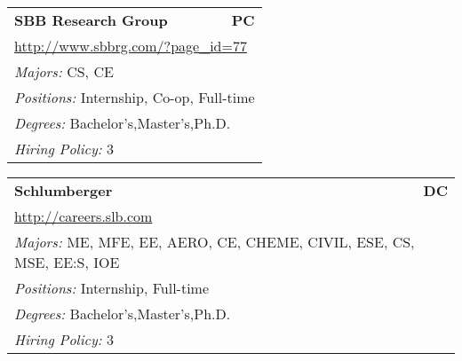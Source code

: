 \documentclass[twoside]{article}
\begin{document}
\begin{center}
\begin{multicols}{3}
\begin{FlushLeft}
\begin{minipage}{\columnwidth}
\end{minipage}
 
\begin{minipage}{\columnwidth}\begin{tabularx}{.95\columnwidth}{Xr}
                 {\Large\bf SBB Research Group} & {\Large\bf PC}\\
    \multicolumn{2}{p{.95\columnwidth}}{\url{http://www.sbbrg.com/?page_id=77}}\\
    \multicolumn{2}{p{.95\columnwidth}}{\emph{Majors:} CS, CE}\\
    \multicolumn{2}{p{.95\columnwidth}}{\emph{Positions:} Internship, Co-op, Full-time}\\
    \multicolumn{2}{p{.95\columnwidth}}{\emph{Degrees:} Bachelor's,Master's,Ph.D.}\\
    \multicolumn{2}{p{.95\columnwidth}}{\emph{Hiring Policy:} 3}\\
    \end{tabularx}
    
\end{minipage}
 
\begin{minipage}{\columnwidth}\begin{tabularx}{.95\columnwidth}{Xr}
                 {\Large\bf Schlumberger} & {\Large\bf DC}\\
    \multicolumn{2}{p{.95\columnwidth}}{\url{http://careers.slb.com}}\\
    \multicolumn{2}{p{.95\columnwidth}}{\emph{Majors:} ME, MFE, EE, AERO, CE, CHEME, CIVIL, ESE, CS, MSE, EE:S, IOE}\\
    \multicolumn{2}{p{.95\columnwidth}}{\emph{Positions:} Internship, Full-time}\\
    \multicolumn{2}{p{.95\columnwidth}}{\emph{Degrees:} Bachelor's,Master's,Ph.D.}\\
    \multicolumn{2}{p{.95\columnwidth}}{\emph{Hiring Policy:} 3}\\
    \end{tabularx}
    
\end{minipage}
 

\end{FlushLeft}
\end{multicols}
\end{center}
\end{document}
